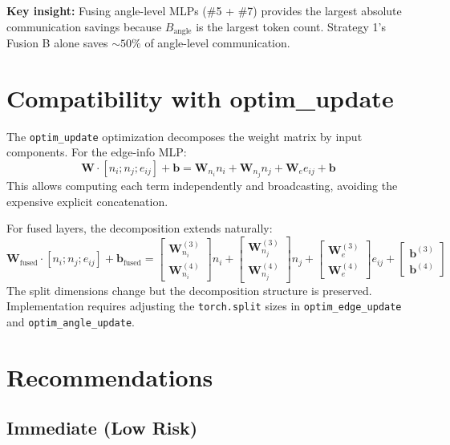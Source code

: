 \documentclass[11pt,a4paper]{article}
\newcommand{\W}{\mathbf{W}}
\newcommand{\bb}{\mathbf{b}}
\begin{document}
\textbf{Key insight:} Fusing angle-level MLPs (\#5 + \#7) provides the largest absolute communication savings because $B_{\text{angle}}$ is the largest token count. Strategy 1's Fusion B alone saves $\sim 50\%$ of angle-level communication.

\section{Compatibility with optim\_update}

The \texttt{optim\_update} optimization decomposes the weight matrix by input components. For the edge-info MLP:
\begin{equation}
    \W \cdot [n_i; n_j; e_{ij}] + \bb = \W_{n_i} n_i + \W_{n_j} n_j + \W_e e_{ij} + \bb
\end{equation}
This allows computing each term independently and broadcasting, avoiding the expensive explicit concatenation.

For fused layers, the decomposition extends naturally:
\begin{equation}
    \W_{\text{fused}} \cdot [n_i; n_j; e_{ij}] + \bb_{\text{fused}} = \begin{bmatrix} \W_{n_i}^{(3)} \\ \W_{n_i}^{(4)} \end{bmatrix} n_i + \begin{bmatrix} \W_{n_j}^{(3)} \\ \W_{n_j}^{(4)} \end{bmatrix} n_j + \begin{bmatrix} \W_e^{(3)} \\ \W_e^{(4)} \end{bmatrix} e_{ij} + \begin{bmatrix} \bb^{(3)} \\ \bb^{(4)} \end{bmatrix}
\end{equation}
The split dimensions change but the decomposition structure is preserved. Implementation requires adjusting the \texttt{torch.split} sizes in \texttt{optim\_edge\_update} and \texttt{optim\_angle\_update}.

\section{Recommendations}

\subsection{Immediate (Low Risk)}
\end{document}
